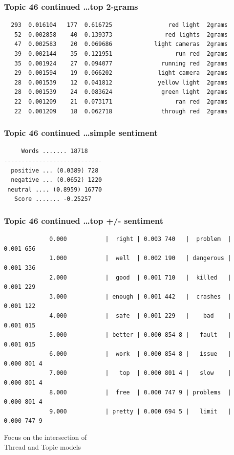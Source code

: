 \documentclass{beamer}
\begin{document}
\begin{frame}[fragile]\frametitle{Topic 46 continued \ldots top 2-grams}
\begin{verbatim}
  293  0.016104   177  0.616725                red light  2grams
   52  0.002858    40  0.139373               red lights  2grams
   47  0.002583    20  0.069686            light cameras  2grams
   39  0.002144    35  0.121951                  run red  2grams
   35  0.001924    27  0.094077              running red  2grams
   29  0.001594    19  0.066202             light camera  2grams
   28  0.001539    12  0.041812             yellow light  2grams
   28  0.001539    24  0.083624              green light  2grams
   22  0.001209    21  0.073171                  ran red  2grams
   22  0.001209    18  0.062718              through red  2grams
\end{verbatim}
\end{frame}

\begin{frame}[fragile]\frametitle{Topic 46 continued \ldots simple sentiment}
\begin{verbatim}   
     Words ....... 18718     
---------------------------- 
  positive ... (0.0389) 728  
  negative ... (0.0652) 1220 
 neutral .... (0.8959) 16770 
   Score ....... -0.25257    
 \end{verbatim}
\end{frame}

\begin{frame}[fragile]\frametitle{Topic 46 continued \ldots top +/- sentiment}
\begin{verbatim}   
             0.000           |  right | 0.003 740   |  problem  | 0.001 656   
             1.000           |  well  | 0.002 190   | dangerous | 0.001 336   
             2.000           |  good  | 0.001 710   |  killed   | 0.001 229   
             3.000           | enough | 0.001 442   |  crashes  | 0.001 122   
             4.000           |  safe  | 0.001 229   |    bad    | 0.001 015   
             5.000           | better | 0.000 854 8 |   fault   | 0.001 015   
             6.000           |  work  | 0.000 854 8 |   issue   | 0.000 801 4 
             7.000           |   top  | 0.000 801 4 |   slow    | 0.000 801 4 
             8.000           |  free  | 0.000 747 9 | problems  | 0.000 801 4 
             9.000           | pretty | 0.000 694 5 |   limit   | 0.000 747 9 
\end{verbatim}
\end{frame}


\begin{frame}
\begin{center}
{\Huge Focus on the intersection of \\[15 pt] Thread and Topic models}
\end{center}
\end{frame}
\end{document}
